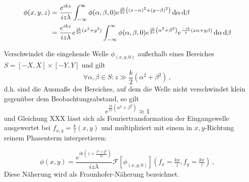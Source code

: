 \begin{align}
\phi(x,y, z)&=\frac{e^{ikz}}{iz\lambda}
\int_{-\infty}^\infty 
\phi(\alpha,\beta,0)
e^{\frac{ik}{2z}\left(\left(x-\alpha\right)^2+\left(y-\beta\right)^2\right)}
\dif \alpha \dif \beta \nonumber \\
&=\frac{e^{ikz}}{iz\lambda}e^{\frac{ik}{2z}(x^2+y^2)}
\int_{-\infty}^\infty 
\phi(\alpha,\beta,0)
e^{\frac{ik}{2z}\left(\alpha^2+\beta^2\right)}
e^{\frac{-ik}{ z}\left(x\alpha+y\beta\right)}
\dif \alpha \dif \beta
\end{align}



Verschwindet die eingehende Welle $\phi_(x,y,0)$ außerhalb eines Bereiches $S=[-X,X]\times[-Y,Y]$ und gilt 
\begin{equation}
\forall \alpha,\beta \in S:	z\gg \frac{k}{2}\left(\alpha^2+\beta^2\right) \, , 
\end{equation}
d.h. sind die Ausmaße des Bereiches, auf dem die Welle nicht verschwindet klein gegenüber dem Beobachtungsabstand, so gilt
\begin{equation}
e^{\frac{ik}{2z}\left(\alpha^2+\beta^2\right)}\approx 1
\end{equation}
und Gleichung XXX lässt sich als Fouriertransformation der Eingangswelle ausgewertet bei $f_{x,y}=\tfrac{k}{z}(x,y)$ und multipliziert mit einem in $x,y$-Richtung reinem Phasenterm interpretieren:

\begin{equation}
\phi(x,y)=\frac{e^{ik(z+\frac{x^2+y^2}{2z})}}{iz\lambda}\mathscr{F}\left[\phi_(x,y,0)\right](f_x=\tfrac{kx}{z},f_y=\tfrac{kx}{z}) \, ,
\end{equation}
Diese Näherung wird als Fraunhofer-Näherung bezeichnet.
